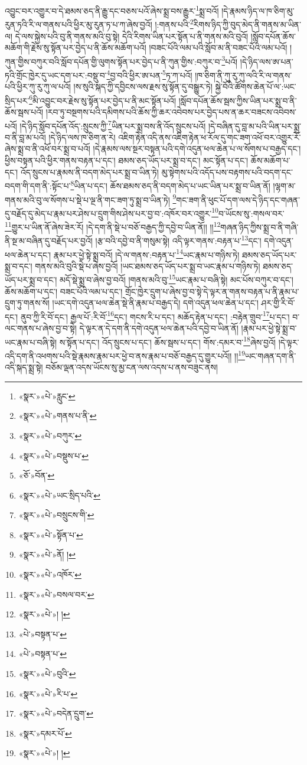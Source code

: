 འབྱུང་བར་འགྱུར་བ་དེ་ཐམས་ཅད་ནི་རྒྱུ་དང་བཅས་པའོ་ཞེས་སྨྲ་བས་རྒྱུར་\footnote{«སྣར་»«པེ་»རླུང་}སྨྲ་བའོ། །དེ་རྣམས་ཉིད་ལ་ཁ་ཅིག་མུ་རུན་ཏའི་རི་ལ་གནས་པའི་ཕྱིར་མུ་རུན་ཏ་པ་ཀ་ཞེས་བྱའོ། །:གནས་པའི་\footnote{«སྣར་»«པེ་»གནས་པ་ནི་}རིགས་ཉིད་ཀྱི་བུད་མེད་ནི་གནས་མ་ཡིན་ལ། དེ་ལས་སྐྱེས་པའི་བུ་ནི་གནས་མའི་བུ་སྟེ། དེའི་རིགས་ཡིན་པར་སྟོན་པ་ནི་གནས་མའི་བུའོ། །སློབ་དཔོན་ཆོས་མཆོག་གི་རྗེས་སུ་སྟོན་པར་བྱེད་པ་ནི་ཆོས་མཆོག་པའོ། །བཟང་པོའི་ལམ་པའི་སློབ་མ་ནི་བཟང་པོའི་ལམ་པའོ། །ཀུན་གྱིས་བཀུར་བའི་སློབ་དཔོན་གྱི་ལུགས་སྟོན་པར་བྱེད་པ་ནི་ཀུན་གྱིས་:བཀུར་བ་\footnote{«སྣར་»«པེ་»བཀུར་}པའོ། །དེ་ཉིད་ལས་ཨ་པན་ཏའི་གྲོང་ཁྱེར་དུ་ཡང་དག་པར་:བསྡུ་བ་\footnote{«སྣར་»«པེ་»བསྡུས་པ་}བྱ་བའི་ཕྱིར་ཨ་པན་\footnote{«ཅོ་»བོན་}ཏ་ཀ་པའོ། །ཁ་ཅིག་ནི་ཀུ་རུ་ཀུ་ལའི་རི་ལ་གནས་པའི་ཕྱིར་ཀུ་རུ་ཀུ་ལ་པའོ། །ས་སུའི་སྐད་ཀྱི་དབྱིངས་ལས་རྗས་སུ་སྟོན་དུ་བསྒྱུར་ཏེ། སྐྱེ་བོའི་ཚོགས་ཆེན་པོ་ལ་:ཡང་སྲིད་པར་\footnote{«སྣར་»«པེ་»ཡང་སྲིད་པའི་}མི་འབྱུང་བར་རྗེས་སུ་སྟོན་པར་བྱེད་པ་ནི་མང་སྟོན་པའོ། །སློབ་དཔོན་ཆོས་སྦས་ཀྱིས་ཡིན་པར་སྨྲ་བ་ནི་ཆོས་སྦས་པའོ། །རབ་ཏུ་བསྔགས་པའི་དམིགས་པའི་ཆོས་ཀྱི་ཆར་འབེབས་པར་བྱེད་པས་ན་ཆར་བཟངས་འབེབས་པའོ། །དེ་ཉིད་སློབ་དཔོན་འོད་:སྲུངས་ཀྱི་\footnote{«སྣར་»«པེ་»བསྲུངས་གི་}ཡིན་པར་སྨྲ་བས་ནི་འོད་སྲུངས་པའོ། །དེ་བཞིན་དུ་བླ་མ་པའི་ཡིན་པར་སྨྲ་བ་ནི་བླ་མ་པའོ། །དེ་ཉིད་ལས་ཁ་ཅིག་ན་རེ། འཇིག་རྟེན་འདི་ནས་འཇིག་རྟེན་ཕ་རོལ་དུ་གང་ཟག་འཕོ་བར་འགྱུར་རོ་ཞེས་སྨྲ་བ་ནི་འཕོ་བར་སྨྲ་བ་པའོ། །དེ་རྣམས་ལས་སྔར་བསྟན་པའི་དགེ་འདུན་ཕལ་ཆེན་པ་ལ་སོགས་པ་བརྒྱད་དང་། ཕྱིས་བསྟན་པའི་ཕྱིར་གནས་བརྟན་པ་དང་། ཐམས་ཅད་ཡོད་པར་སྨྲ་བ་དང་། མང་སྟོན་པ་དང་། ཆོས་མཆོག་པ་དང་། འོད་སྲུངས་པ་རྣམས་ནི་བདག་མེད་པར་སྨྲ་བ་ཡིན་ཏེ། མུ་སྟེགས་པའི་འདོད་པས་བརྟགས་པའི་བདག་དང་བདག་གི་དག་ནི་:སྟོང་པ་\footnote{«སྣར་»«པེ་»སྟོན་པ་}ཡིན་པ་དང་། ཆོས་ཐམས་ཅད་ནི་བདག་མེད་པ་ཡང་ཡིན་པར་སྨྲ་བ་ཡིན་ནོ། །ལྷག་མ་གནས་མའི་བུ་ལ་སོགས་པ་སྡེ་པ་ལྔ་ནི་གང་ཟག་ཏུ་སྨྲ་བ་ཡིན་ཏེ། \footnote{«སྣར་»«པེ་»ནོ། ། }གང་ཟག་ནི་ཕུང་པོ་དག་ལས་དེ་ཉིད་དང་གཞན་དུ་བརྗོད་དུ་མེད་པ་རྣམ་པར་ཤེས་པ་དྲུག་གིས་ཤེས་པར་བྱ་བ་:འཁོར་བར་འགྱུར་\footnote{«སྣར་»«པེ་»འཁོར་}བ་ཡོངས་སུ་:གསལ་བར་\footnote{«སྣར་»«པེ་»བསལ་བར་}གྱུར་པ་ཡིན་ནོ་ཞེས་ཟེར་རོ། །དེ་དག་ནི་སྡེ་པ་བཅོ་བརྒྱད་ཀྱི་དབྱེ་བ་ཡིན་ནོ།། །།\footnote{«སྣར་»«པེ་»། །}གཞན་ཉིད་ཀྱིས་སྨྲ་བ་ནི་གཞི་ནི་སྔ་མ་བཞིན་དུ་བརྗོད་པར་བྱའོ། །རྩ་བའི་དབྱེ་བ་ནི་གསུམ་སྟེ། འདི་ལྟར་གནས་:བརྟན་པ་\footnote{«པེ་»བསྟན་པ་}དང་། དགེ་འདུན་ཕལ་ཆེན་པ་དང་། རྣམ་པར་ཕྱེ་སྟེ་སྨྲ་བའོ། །དེ་ལ་གནས་:བརྟན་པ་\footnote{«པེ་»བསྟན་པ་}ཡང་རྣམ་པ་གཉིས་ཏེ། ཐམས་ཅད་ཡོད་པར་སྨྲ་བ་དང་། གནས་མའི་བུའི་སྡེ་པ་ཞེས་བྱའོ། །ཡང་ཐམས་ཅད་ཡོད་པར་སྨྲ་བ་ཡང་རྣམ་པ་གཉིས་ཏེ། ཐམས་ཅད་ཡོད་པར་སྨྲ་བ་དང་། མདོ་སྡེ་སྨྲ་བ་ཞེས་བྱ་བའོ། །གནས་མའི་བུ་\footnote{«སྣར་»«པེ་»བུའི་}ཡང་རྣམ་པ་བཞི་སྟེ། མང་པོས་བཀུར་བ་དང་། ཆོས་མཆོག་པ་དང་། བཟང་པོའི་ལམ་པ་དང་། གྲོང་ཁྱེར་དྲུག་པ་ཞེས་བྱ་བ་སྟེ་དེ་ལྟར་ན་གནས་བརྟན་པ་ནི་རྣམ་པ་དྲུག་ཏུ་གནས་སོ། །ཡང་དགེ་འདུན་ཕལ་ཆེན་སྡེ་ནི་རྣམ་པ་བརྒྱད་དེ། དགེ་འདུན་ཕལ་ཆེན་པ་དང་། ཤར་གྱི་རི་བོ་དང་། ནུབ་ཀྱི་རི་བོ་དང་། རྒྱལ་པོ་:རི་བོ་\footnote{«སྣར་»«པེ་»རི་པ་}དང་། གངས་རི་པ་དང་། མཆོད་རྟེན་པ་དང་། :བརྟེན་གྲུབ་\footnote{«སྣར་»«པེ་»བདེན་དྲུག་}པ་དང་། བ་ལང་གནས་པ་ཞེས་བྱ་བ་སྟེ། དེ་ལྟར་ན་དེ་དག་ནི་དགེ་འདུན་ཕལ་ཆེན་པའི་དབྱེ་བ་ཡིན་ནོ། །རྣམ་པར་ཕྱེ་སྟེ་སྨྲ་བ་ཡང་རྣམ་པ་བཞི་སྟེ། ས་སྟོན་པ་དང་། འོད་སྲུངས་པ་དང་། ཆོས་སྦས་པ་དང་། གོས་:དམར་བ་\footnote{«སྣར་»དམར་པོ་}ཞེས་བྱའོ། །དེ་ལྟར་འདི་དག་ནི་འཕགས་པའི་སྡེ་རྣམས་རྣམ་པར་ཕྱེ་བ་ནས་རྣམ་པ་བཅོ་བརྒྱད་དུ་གྱུར་པའོ།། །།\footnote{«སྣར་»«པེ་»། །}ཡང་གཞན་དག་ནི་འདི་སྐད་སྨྲ་སྟེ། བཅོམ་ལྡན་འདས་ཡོངས་སུ་མྱ་ངན་ལས་འདས་པ་ནས་བཟུང་ནས། 
